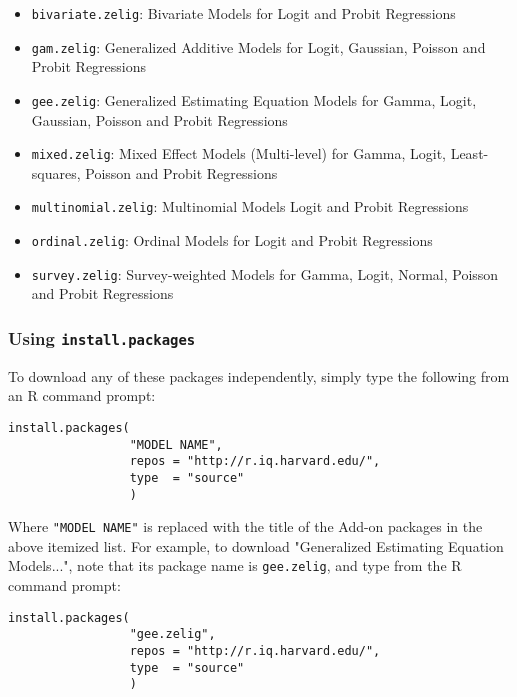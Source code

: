 \begin{itemize}

	\item {\tt bivariate.zelig}: Bivariate Models for Logit and Probit Regressions

	\item {\tt gam.zelig}: Generalized Additive Models for Logit, Gaussian, Poisson and Probit Regressions

	\item {\tt gee.zelig}: Generalized Estimating Equation Models for Gamma, Logit, Gaussian, Poisson and Probit Regressions
	
	\item {\tt mixed.zelig}: Mixed Effect Models (Multi-level) for Gamma, Logit, Least-squares, Poisson and Probit Regressions
	
	\item {\tt multinomial.zelig}: Multinomial Models Logit and Probit Regressions
	
	\item {\tt ordinal.zelig}: Ordinal Models for Logit and Probit Regressions

	\item {\tt survey.zelig}: Survey-weighted Models for Gamma, Logit, Normal, Poisson and Probit Regressions

\end{itemize}

\subsubsection{Using {\tt install.packages}}
\begin{minipage}{\linewidth}
To download any of these packages independently, simply type the following from an R command prompt:
\begin{verbatim}
install.packages(
                 "MODEL NAME",
                 repos = "http://r.iq.harvard.edu/",
                 type  = "source"
                 )
\end{verbatim}

Where {\tt "MODEL NAME"} is replaced with the title of the Add-on packages in the above itemized list. For example, to download "Generalized Estimating Equation Models...", note that its package name is {\tt gee.zelig}, and type from the R command prompt:
\begin{verbatim}
install.packages(
                 "gee.zelig",
                 repos = "http://r.iq.harvard.edu/",
                 type  = "source"
                 )
\end{verbatim}
\end{minipage}

